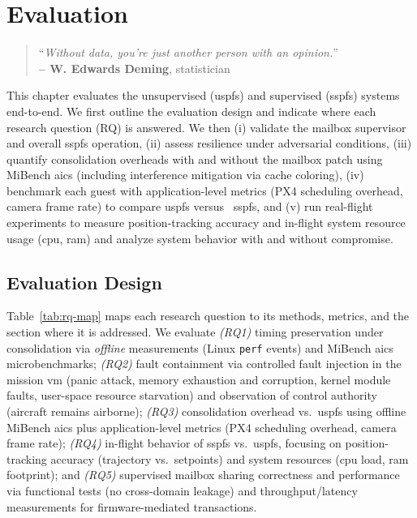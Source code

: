 %
\chapter{Evaluation}
\label{cha:evaluation}
%
\begin{quote}
\begin{flushright}
``\emph{Without data, you're just another person with an opinion.}'' \\
\textbf{-- W. Edwards Deming}, statistician
\end{flushright}
\end{quote}

This chapter evaluates the unsupervised (\gls{uspfs}) and supervised
(\gls{sspfs}) systems end-to-end. We first outline the evaluation design and
indicate where each research question (RQ) is answered. We then (i) validate the
mailbox supervisor and overall \gls{sspfs} operation, (ii) assess resilience
under adversarial conditions, (iii) quantify consolidation overheads with and
without the mailbox patch using MiBench \gls{aics} (including interference
mitigation via cache coloring), (iv) benchmark each guest with application-level
metrics (PX4 scheduling overhead, camera frame rate) to compare \gls{uspfs}
versus \
\gls{sspfs}, and (v) run real-flight experiments to measure position-tracking
accuracy and in-flight system resource usage (\gls{cpu}, \gls{ram}) and analyze
system behavior with and without compromise.

\section{Evaluation Design}
\label{sec:eval-design}
Table~\ref{tab:rq-map} maps each research question to its methods, metrics, and the section where it is addressed.
%
We evaluate \emph{(RQ1)} timing preservation under consolidation via \emph{offline} measurements (Linux \texttt{perf} events) and MiBench \gls{aics} microbenchmarks; 
\emph{(RQ2)} fault containment via controlled fault injection in the mission
\gls{vm} (panic attack, memory exhaustion and corruption, kernel module faults, user-space resource starvation) and observation of control authority (aircraft remains airborne);
\emph{(RQ3)} consolidation overhead vs.\ \gls{uspfs} using offline MiBench
\gls{aics} plus application-level metrics (PX4 scheduling overhead, camera frame
rate);
\emph{(RQ4)} in-flight behavior of \gls{sspfs} vs.\ \gls{uspfs}, focusing on
position-tracking accuracy (trajectory vs.\ setpoints) and system resources
(\gls{cpu} load, \gls{ram} footprint); and 
\emph{(RQ5)} supervised mailbox sharing correctness and performance via
functional tests (no cross-domain leakage) and throughput/latency measurements
for firmware-mediated transactions.

